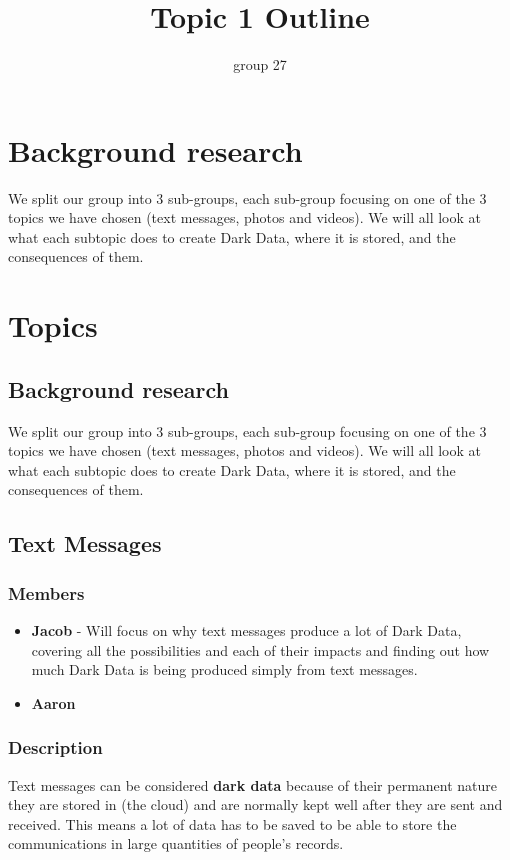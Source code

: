 \documentclass{article}
\begin{document}
\title{Topic 1 Outline}
\author{group 27}

\maketitle
\newpage

\section{Background research}
We split our group into 3 sub-groups, each sub-group focusing on one of the 3 topics we have chosen (text messages,
photos and videos). We will all look at what each subtopic does to create Dark Data, where it is stored, and the
consequences of them.

\section{Topics}

        \subsection{Background research}
        We split our group into 3 sub-groups, each sub-group focusing on one of the 3 topics we have chosen (text messages,
        photos and videos). We will all look at what each subtopic does to create Dark Data, where it is stored, and the
        consequences of them.
    \subsection{Text Messages} 
        \subsubsection{Members}
        \begin{itemize}
            \item \textbf{Jacob} - Will focus on why text messages produce a lot of Dark Data, covering all the 
            possibilities and each of their impacts and finding out how much Dark Data is being produced simply from text 
            messages.
            \item \textbf{Aaron}
        \end{itemize}
        \subsubsection{Description}
        Text messages can be considered \textbf{dark data} because of their permanent nature they are stored in (the cloud) and 
        are normally kept well after they are sent and received. This means a lot of data has to be saved to be able to
        store the communications in large quantities of people's records. 
\end{document}
